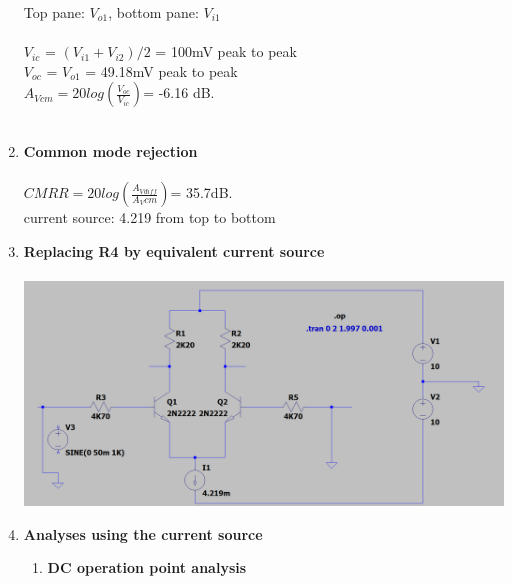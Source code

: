 \documentclass{article}
\begin{document}
\begin{enumerate}
			Top pane: \(V_{o1}\), bottom pane: \(V_{i1}\)\\\\
			\(V_{ic}\) = \((V_{i1} + V_{i2})/2\) = 100mV peak to peak\\
			\(V_{oc}\) = \(V_{o1}\) = 49.18mV peak to peak\\
			\(A_{Vcm} = 20log(\frac{V_{oc}}{V_{ic}}) \)= -6.16 dB.\\\\
			\item \textbf{Common mode rejection}\\\\
			\(CMRR = 20 log (\frac{A_{Vdiff}}{A_Vcm}) \)= 35.7dB.\\
			\pagebreak
			current source: 4.219 from top to bottom
			\item \textbf{Replacing R4 by equivalent current source}\\\\
			\includegraphics[scale=0.4]{circuit 5}
			\item \textbf{Analyses using the current source}
			\begin{enumerate}
				\item \textbf{DC operation point analysis}\\\\
				

\end{enumerate}
\end{enumerate}
\end{document}
